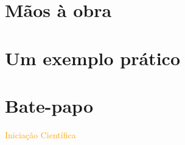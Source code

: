 \documentclass[aspectratio=169]{beamer} %
\begin{document}
\section{Mãos à obra}

\section{Um exemplo prático}

\section{Bate-papo}









{
\begin{frame}
\vspace{2cm}
\begin{center}
\huge
	\textcolor{orange}{Iniciação Científica}
\end{center}

\end{frame} 
}











\end{document}
